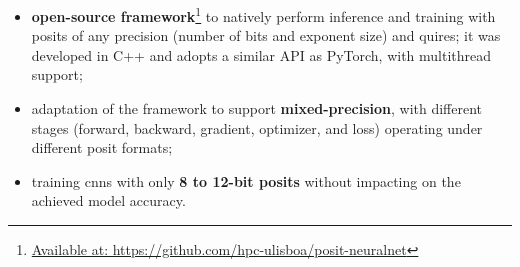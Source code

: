 \documentclass{article}
\begin{document}
	\begin{itemize}[leftmargin=*]
		\item \textbf{open-source framework}\footnote{\href{https://github.com/hpc-ulisboa/posit-neuralnet}{Available at: https://github.com/hpc-ulisboa/posit-neuralnet}} to natively perform inference and training with posits of any precision (number of bits and exponent size) and quires; it was developed in C++ and adopts a similar API as PyTorch, with multithread support;
		
		\item adaptation of the framework to support \textbf{mixed-precision}, with different stages (forward, backward, gradient, optimizer, and loss) operating under different posit formats;
		
		
		
		\item training \glspl{cnn} with only \textbf{8 to 12-bit posits} without impacting on the achieved model accuracy.
	\end{itemize}
	
	
\end{document}
